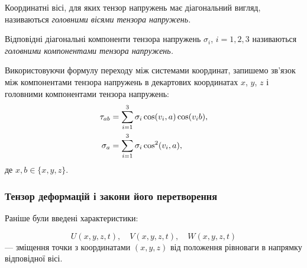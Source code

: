 \begin{definition}
	Координатні вісі, для яких тензор напружень має діагональний вигляд, називаються \it{головними вісями тензора напружень}.
\end{definition}

\begin{definition}
	Відповідні діагональні компоненти тензора напружень $\sigma_i$, $i = 1,2,3$ називаються \it{головними компонентами тензора напружень}. 
\end{definition}

Використовуючи формулу переходу між системами координат, запишемо зв'язок між компонентами тензора напружень в декартових координатах $x$, $y$, $z$ і головними компонентами тензора напружень:
\begin{align}
	\tau_{a b} &= \displaystyle\sum\limits_{i = 1}^3 \sigma_i \cos(v_i, a) \cos (v_i b), \\
	\sigma_a &= \displaystyle\sum\limits_{i = 1}^3 \sigma_i \cos^2(v_i, a),
\end{align}
де $x, b \in \{x, y, z\}$.

\subsubsection{Тензор деформацій і закони його перетворення}

Раніше були введені характеристики:

\begin{equation}
	U(x, y, z, t), \quad V(x, y, z, t), \quad W(x, y, z, t)
\end{equation}
--- зміщення точки з координатами $(x, y, z)$ від положення рівноваги в напрямку відповідної вісі. \medskip

